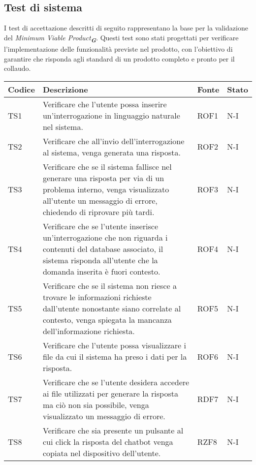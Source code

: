 \newpage

\subsection{Test di sistema}
\label{sec:Test di sistema}
I test di accettazione descritti di seguito rappresentano la base per la validazione del \emph{Minimum Viable Product}\textsubscript{\textit{\textbf{G}}}. Questi test sono stati progettati per verificare l’implementazione delle funzionalità previste nel prodotto, con l’obiettivo di garantire che risponda agli standard di un prodotto completo e pronto per il collaudo.

\begin{table}[h!]
    \centering
    \renewcommand{\arraystretch}{1.5}
    \begin{tabularx}{\textwidth}{|p{}|X|p{}|p{}|}\hline
    \rowcolor[HTML]{FFD700}
    \textbf{Codice} & \textbf{Descrizione} & \textbf{Fonte} & \textbf{Stato} \\ \hline
    TS1 & Verificare che l'utente possa inserire un'interrogazione in linguaggio naturale 
    nel sistema. & ROF1 & N-I \\ \hline
    TS2 & Verificare che all'invio dell'interrogazione al sistema, venga generata una risposta. & ROF2 & N-I \\ \hline
    TS3 & Verificare che se il sistema fallisce nel generare una risposta per via di un problema interno, venga visualizzato all'utente un messaggio di errore, chiedendo di riprovare più tardi. & ROF3 & N-I \\ \hline
    TS4 & Verificare che se l'utente inserisce un'interrogazione che non riguarda i contenuti del database associato, il sistema risponda all'utente che la domanda inserita è fuori contesto. & ROF4 & N-I \\ \hline
    TS5 & Verificare che se il sistema non riesce a trovare le informazioni richieste dall'utente nonostante siano correlate al contesto, venga spiegata la mancanza dell'informazione richiesta. & ROF5 & N-I \\ \hline
    TS6 & Verificare che l'utente possa visualizzare i file da cui il sistema ha preso i dati per la risposta. & ROF6 & N-I \\ \hline
    TS7 & Verificare che se l'utente desidera accedere ai file utilizzati per generare la risposta ma ciò non sia possibile, venga visualizzato un messaggio di errore. & RDF7 & N-I \\ \hline
    TS8 & Verificare che sia presente un pulsante al cui click la risposta del chatbot venga copiata nel dispositivo dell'utente. & RZF8 & N-I \\ \hline

\end{tabularx}
\end{table}
